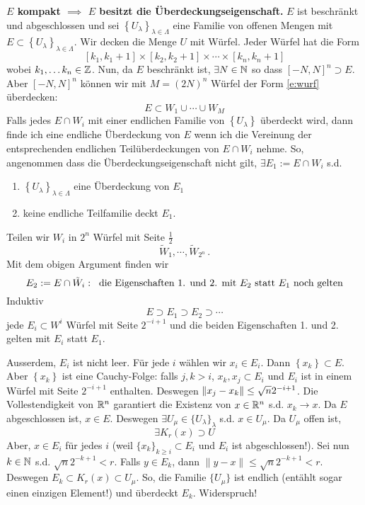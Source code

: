 \begin{Bew}
{\bf $E$ kompakt $\implies$ $E$ besitzt die Überdeckungseigenschaft.} 
$E$ ist beschränkt und abgeschlossen und sei $\left\{ U_\lambda \right\}_{\lambda\in\Lambda}$ eine Familie von offenen Mengen mit $E\subset\left\{ U_\lambda \right\}_{\lambda\in\Lambda}$. Wir decken die Menge $U$ mit Würfel. Jeder W\"urfel hat die Form
 \begin{equation}\label{e:wurf}
\left[k_1,k_1+1\right]\times \left[ k_2,k_2+1 \right]\times \cdots\times \left[ k_n,k_n+1 \right]
\end{equation}
wobei $k_1, \ldots k_n \in \mathbb{Z}$.
Nun, da $E$ beschr\"ankt ist, $\exists N\in \mathbb{N}$ so dass $[-N, N]^n \supset E$. Aber
$[-N, N]^n$ k\"onnen wir mit $M=(2N)^n$ W\"urfel der Form \eqref{e:wurf} \"uberdecken:
 \[E\subset W_1\cup\cdots\cup W_M\]
  Falls jedes $E\cap W_i$ mit einer endlichen Familie von $\left\{ U_\lambda \right\}$ überdeckt wird, dann finde ich eine endliche Überdeckung von $E$ wenn ich die Vereinung der entsprechenden endlichen Teil\"uberdeckungen
von $E\cap W_i$ nehme. So, angenommen dass die Überdeckungseigenschaft nicht gilt,
  $\exists E_1:= E\cap W_i$ s.d.
  \begin{enumerate}
    \item $\left\{ U_\lambda \right\}_{\lambda\in\Lambda}$ eine Überdeckung von $E_1$
    \item keine endliche Teilfamilie deckt $E_1$.
  \end{enumerate}
  Teilen wir $W_i$ in $2^n$ Würfel mit Seite $\frac{1}{2}$
  \[\tilde W_1,\cdots,\tilde W_{2^n}\, .\]
Mit dem obigen Argument finden wir
  \[E_2:= E\cap \tilde W_i:\hspace{2mm}\text{die Eigenschaften 1. und 2. mit $E_2$ statt $E_1$ noch gelten}\]
  Induktiv
  \[E\supset E_1\supset E_2\supset\cdots\]
  jede $E_i\subset W^i$ Würfel mit Seite $2^{-i+1}$ und die beiden Eigenschaften 1. und 2. gelten mit $E_i$ statt $E_1$.

Ausserdem, $E_i$ ist nicht leer. F\"ur jede $i$ w\"ahlen wir $x_i\in E_i$.
Dann $\left\{ x_k \right\}\subset E$. Aber $\left\{ x_k \right\}$ ist eine Cauchy-Folge: falls $j,k>i$, 
$x_k,x_j\subset E_i$ und $E_i$ ist in einem W\"urfel mit Seite $2^{-i+1}$ enthalten.
Deswegen $\left\| x_j-x_k \right\|\leq \sqrt{n}2^{-i+1}$. Die Vollestendigkeit von $\mathbb{R}^n$ garantiert
die Existenz von $x\in \mathbb{R}^n$ s.d. $x_k\to x$. Da $E$ abgeschlossen ist, $x\in E$. Deswegen $\exists U_\mu
\in \{U_\lambda\}_\lambda$
s.d. $x\in U_\mu$. Da $U_\mu$ offen ist,
  \[\exists  K_r(x)\supset U\]
Aber, $x\in E_i$ f\"ur jedes $i$ (weil $\{x_k\}_{k\geq i}\subset E_i$ und $E_i$ ist abgeschlossen!).  
Sei nun $k\in \mathbb{N}$ s.d. $\sqrt{n}2^{-k+1} < r$. Falls $y\in E_k$, dann $\|y-x\|\leq \sqrt{n}2^{-k+1} < r$.
Deswegen $E_k\subset K_r (x)\subset U_\mu$. So, die Familie $\{U_\mu\}$ ist endlich (ent\"ahlt
sogar einen einzigen Element!) und \"uberdeckt  $E_k$. Widerspruch!
\end{Bew}
